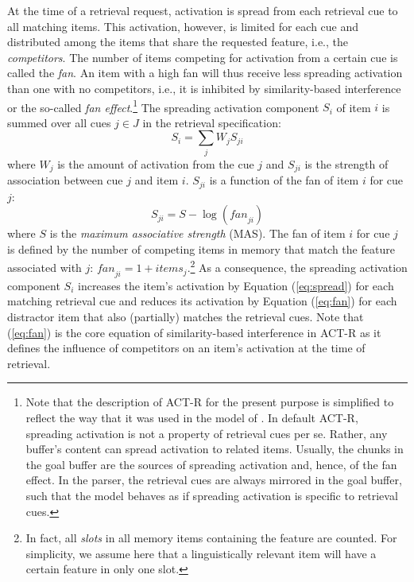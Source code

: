 \documentclass{cambridge7A}\usepackage[]{graphicx}\usepackage[]{color}
\begin{document}
At the time of a retrieval request, activation is spread from each retrieval cue to all matching items. This activation, however, is limited for each cue and distributed among the items that share the requested feature, i.e., the \emph{competitors}. The number of items competing for activation from a certain cue is called the \textit{fan}. An item with a high fan will thus receive less spreading activation than one with no competitors, i.e., it is inhibited by similarity-based interference or the so-called  \textit{fan effect}.\footnote{Note that the description of ACT-R for the present purpose is simplified to reflect the way that it was used in the model of \cite{LewisVasishth2005}. In default ACT-R, spreading activation is not a property of retrieval cues per se. Rather, any buffer's content can spread activation to related items. Usually, the chunks in the goal buffer are the sources of spreading activation and, hence, of the fan effect. In the \cite{LewisVasishth2005} parser, the retrieval cues are always mirrored in the goal buffer, such that the model behaves as if spreading activation is specific to retrieval cues.}
The spreading activation component $S_i$ of item $i$ is summed over all cues $j \in J$ in the retrieval specification: 
\begin{equation}\label{eq:spread}
	S_i = \sum_j W_{j} S_{ji}
\end{equation}
where $W_{j}$ is the amount of activation from the cue $j$ and $S_{ji}$ is the strength of association between cue $j$ and item $i$. $S_{ji}$ is a function of the fan of item $i$ for cue $j$:%
\begin{equation}\label{eq:fan}
	S_{ji} = S - \log(\textit{fan}_{ji})
\end{equation}
where $S$ is the  \textit{maximum associative strength} (MAS). The fan of item $i$ for cue $j$ is defined by the number of competing items in memory that match the feature associated with $j$: $\textit{fan}_{ji} = 1+\textit{items}_j$.\footnote{In fact, all \textit{slots} in all memory items containing the feature are counted. For simplicity, we assume here that a linguistically relevant item will have a certain feature in only one slot.}
As a consequence, the spreading activation component $S_i$ increases the item's activation by Equation (\ref{eq:spread}) for each matching retrieval cue and reduces its activation by Equation (\ref{eq:fan}) for each distractor item that also (partially) matches the retrieval cues. Note that (\ref{eq:fan}) is the core equation of  similarity-based interference in ACT-R as it defines the influence of competitors on an item's activation at the time of retrieval.
\end{document}
